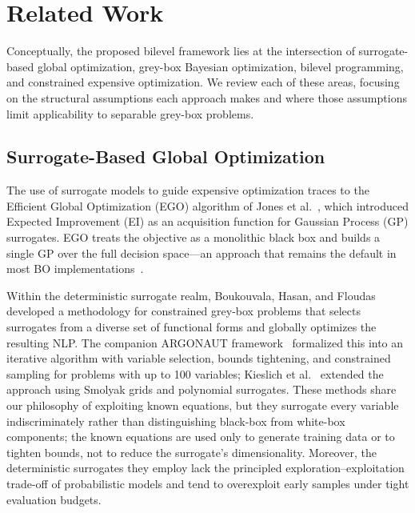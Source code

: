 \documentclass[12pt,a4paper]{article}%
\theoremstyle{plain}%
\theoremstyle{remark}%
\theoremstyle{definition}%
\begin{document}
\section{Related Work}\label{sec:related_work}

Conceptually, the proposed bilevel framework lies at the intersection of surrogate-based global optimization, grey-box Bayesian optimization, bilevel programming, and constrained expensive optimization. We review each of these areas, focusing on the structural assumptions each approach makes and where those assumptions limit applicability to separable grey-box problems.

\subsection{Surrogate-Based Global Optimization}

The use of surrogate models to guide expensive optimization traces to the Efficient Global Optimization (EGO) algorithm of Jones et al.~\cite{jones1998efficient}, which introduced Expected Improvement (EI) as an acquisition function for Gaussian Process (GP) surrogates. EGO treats the objective as a monolithic black box and builds a single GP over the full decision space---an approach that remains the default in most BO implementations~\cite{shahriari2016bo_survey,frazier2018tutorial}.

Within the deterministic surrogate realm, Boukouvala, Hasan, and Floudas~\cite{boukouvala2017greybox_jgo} developed a methodology for constrained grey-box problems that selects surrogates from a diverse set of functional forms and globally optimizes the resulting NLP. The companion ARGONAUT framework~\cite{boukouvala2017argonaut} formalized this into an iterative algorithm with variable selection, bounds tightening, and constrained sampling for problems with up to 100 variables; Kieslich et al.~\cite{kieslich2018smolyak} extended the approach using Smolyak grids and polynomial surrogates. These methods share our philosophy of exploiting known equations, but they surrogate every variable indiscriminately rather than distinguishing black-box from white-box components; the known equations are used only to generate training data or to tighten bounds, not to reduce the surrogate's dimensionality. Moreover, the deterministic surrogates they employ lack the principled exploration--exploitation trade-off of probabilistic models and tend to overexploit early samples under tight evaluation budgets.
\end{document}
